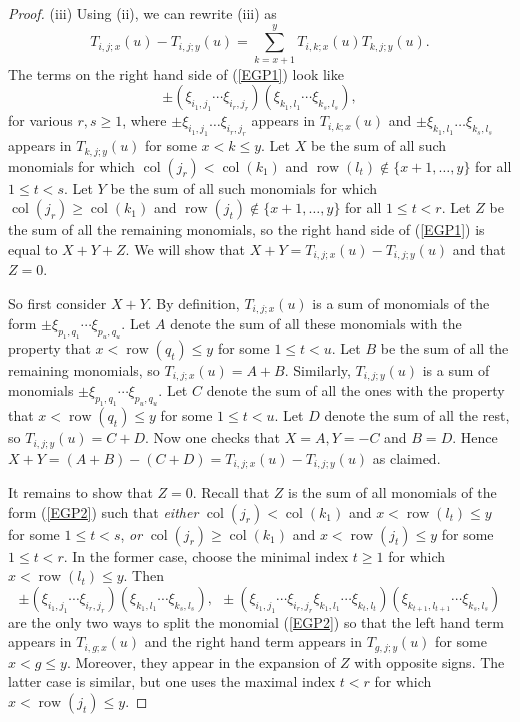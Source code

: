 \documentclass[twoside,12pt,reqno]{amsart}
\def\row{\operatorname{row}}
\def\col{\operatorname{col}}
\begin{document}
\begin{proof}
(iii)
Using (ii), we can rewrite (iii) as
\begin{equation}\label{EGP1}
T_{i,j;x}(u)-T_{i,j;y}(u) = \sum_{k=x+1}^y T_{i,k;x}(u) T_{k,j;y}(u).
\end{equation}
The terms on the right hand side of (\ref{EGP1}) look like
\begin{equation}\label{EGP2}
\pm(\xi_{i_1,j_1}\cdots \xi_{i_r,j_r})(\xi_{k_1,l_1}\cdots\xi_{k_s,l_s}),
\end{equation}
for various $r,s \geq 1$,
where $\pm \xi_{i_1,j_1}\dots \xi_{i_r,j_r}$ appears in $T_{i,k;x}(u)$ and
$\pm \xi_{k_1,l_1}\dots  \xi_{k_s,l_s}$ appears in $T_{k,j;y}(u)$ for some
$x < k \leq y$.
Let $X$ be the sum of all such monomials
for which
$\col(j_r) < \col(k_1)$ 
and $\row(l_t) \notin \{x+1,\dots,y\}$ for
all $1 \leq t < s$.
Let $Y$ be the sum of all such monomials
for which $\col(j_r) \geq \col(k_1)$
and $\row(j_t) \notin \{x+1,\dots,y\}$ for all $1 \leq t < r$.
Let $Z$ be the sum of all the remaining monomials,
so the right hand side of (\ref{EGP1}) is equal to $X+Y+Z$.
We will show that $X+Y = T_{i,j;x}(u)-T_{i,j;y}(u)$ and
that $Z = 0$.

So first consider $X+Y$.
By definition,
$T_{i,j;x}(u)$ is a sum of monomials
of the form $\pm \xi_{p_1,q_1}\cdots \xi_{p_u,q_u}$.
Let $A$ denote the sum of all these monomials
with the property 
that $x < \row(q_t) \leq y$ for some $1 \leq t < u$.
Let $B$ be the sum of all the remaining monomials,
so $T_{i,j;x}(u) = A+B$.
Similarly, $T_{i,j;y}(u)$ is a sum of 
monomials $\pm \xi_{p_1,q_1}\cdots \xi_{p_u,q_u}$.
Let $C$ denote the sum of all the ones
with the property that $x < \row(q_t) \leq y$ for some $1 \leq t < u$.
Let $D$ denote the sum of all the rest, so
$T_{i,j;y}(u) = C+D$.
Now one checks that $X = A, Y = -C$ and $B = D$.
Hence $X+Y = (A+B)-(C+D) = T_{i,j;x}(u) - T_{i,j;y}(u)$
as claimed.

It remains to show that $Z = 0$. Recall that $Z$ is the sum of
all monomials of the form (\ref{EGP2})
such that
{\em either} 
$\col(j_r) < \col(k_1)$ and
$x < \row(l_t) \leq y$ for some $1 \leq t < s$,
{\em or}
$\col(j_r) \geq \col(k_1)$
and $x < \row(j_t) \leq y$ for some $1 \leq t < r$. 
In the former case, choose the 
minimal index $t \geq 1$ for which $x < \row(l_t) \leq y$. Then
$$
\pm(\xi_{i_1,j_1}\cdots \xi_{i_r,j_r})(\xi_{k_1,l_1}\cdots
\xi_{k_s,l_s}),\:\:
\pm(\xi_{i_1,j_1}\cdots \xi_{i_r,j_r}\xi_{k_1,l_1}\cdots
\xi_{k_t,l_t})(\xi_{k_{t+1},l_{t+1}}\cdots   \xi_{k_s,l_s})
$$
are the only two ways to split the monomial
(\ref{EGP2}) so that the left hand term appears in
$T_{i,g;x}(u)$ and the right hand term appears in $T_{g,j;y}(u)$
for some $x < g \leq y$.
Moreover, they appear in the expansion of $Z$ with opposite signs.
The latter case is
similar, but one uses the maximal index $t < r$ 
for which $x < \row(j_t)\leq y$.


\end{proof}
\end{document}
